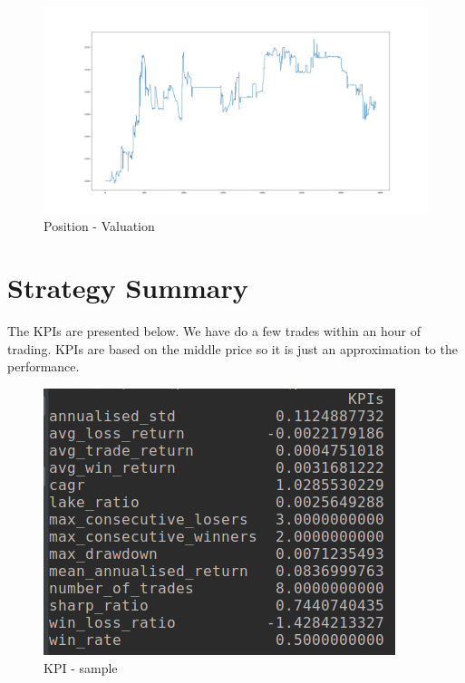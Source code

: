 \documentclass[12pt]{article}
\begin{document}
\begin{figure}[h!]
	\centering
  \includegraphics[width=\textwidth]{strategy6.png}
  \caption{Position - Valuation}
  \label{fig:strat6}
\end{figure}

\FloatBarrier
\section*{Strategy Summary}
The KPIs are presented below. We have do a few trades within an hour of trading. KPIs are based on the middle price so it is just an approximation to the performance.

\begin{figure}[h!]
	\centering
  \includegraphics[scale=0.7]{sample_kpis.png}
  \caption{KPI - sample}
  \label{fig:kpi1}
\end{figure}
\FloatBarrier
\end{document}
